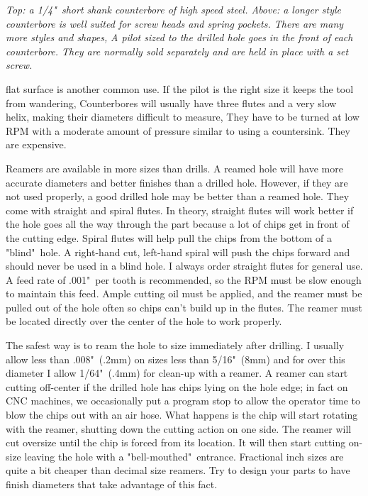 \bigskip
\textit{Top: a 1/4"\ short shank counterbore of high speed steel. Above: a longer
style counterbore is well suited for screw heads and spring pockets. There are
many more styles and shapes,}
\bigskip
\textit{A pilot sized to the drilled hole goes in the front of each counterbore.
They are normally sold separately and are held in place with a set screw.}
\bigskip

flat surface is another common use. If the pilot is the right size it keeps the
tool from wandering, Counterbores will usually have three flutes and a very slow
helix, making their diameters difficult to measure, They have to be turned at
low RPM with a moderate amount of pressure similar to using a countersink. They
are expensive.


Reamers are available in more sizes than drills. A reamed hole will have more
accurate diameters and better finishes than a drilled hole. However, if they are
not used properly, a good drilled hole may be better than a reamed hole. They
come with straight and spiral flutes. In theory, straight flutes will work
better if the hole goes all the way through the part because a lot of chips get
in front of the cutting edge. Spiral flutes will help pull the chips from the
bottom of a "blind"\ hole. A right-hand cut, left-hand spiral will push the chips
forward and should never be used in a blind hole. I always order straight flutes
for general use. A feed rate of .001"\ per tooth is recommended, so the RPM must
be slow enough to maintain this feed. Ample cutting oil must be applied, and the
reamer must be pulled out of the hole often so chips can't build up in the
flutes. The reamer must be located directly over the center of the hole to work
properly.

The safest way is to ream the hole to size immediately after drilling. I usually
allow less than .008"\ (.2mm) on sizes less than 5/16"\ (8mm) and for over this
diameter I allow 1/64"\ (.4mm) for clean-up with a reamer. A reamer can start
cutting off-center if the drilled hole has chips lying on the hole edge; in fact
on CNC machines, we occasionally put a program stop to allow the operator time
to blow the chips out with an air hose. What happens is the chip will start
rotating with the reamer, shutting down the cutting action on one side. The
reamer will cut oversize until the chip is forced from its location. It will
then start cutting on-size leaving the hole with a "bell-mouthed"\ entrance.
Fractional inch sizes are quite a bit cheaper than decimal size reamers. Try to
design your parts to have finish diameters that take advantage of this fact.

